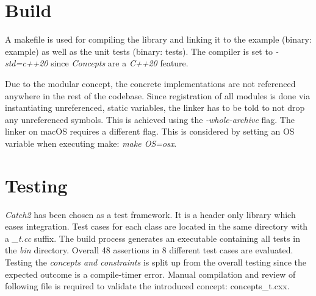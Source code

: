 \section{Build}

A makefile is used for compiling the library and linking it to the example (binary: example) as well as the unit tests (binary: tests). The compiler is set to \emph{-std=c++20} since \emph{Concepts} are a \emph{C++20} feature. 

Due to the modular concept, the concrete implementations are not referenced anywhere in the rest of the codebase. Since registration of all modules is done via instantiating unreferenced, static variables, the linker has to be told to not drop any unreferenced symbols. This is achieved using the \emph{-whole-archive} flag. The linker on macOS requires a different flag. This is considered by setting an OS variable when executing make: \emph{make OS=osx}.



\section{Testing}

\emph{Catch2}\autocite{Catch} has been chosen as a test framework. It is a header only library which eases integration. Test cases for each class are located in the same directory with a \emph{\_t.cc} suffix. The build process generates an executable containing all tests in the \emph{bin} directory. Overall 48 assertions in 8 different test cases are evaluated. 
Testing the \emph{concepts and constraints} is split up from the overall testing since the expected outcome is a compile-timer error. Manual compilation and review of following file is required to validate the introduced concept: concepts\_t.cxx.
